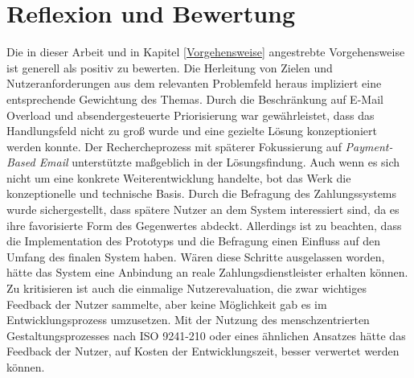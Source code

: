 \section{Reflexion und Bewertung}
\label{Reflektion_und_Bewertung}
Die in dieser Arbeit und in Kapitel \ref{Vorgehensweise} angestrebte Vorgehensweise ist generell als positiv zu bewerten. Die Herleitung von Zielen und Nutzeranforderungen aus dem relevanten Problemfeld heraus impliziert eine entsprechende Gewichtung des Themas. Durch die Beschränkung auf E-Mail Overload und absendergesteuerte Priorisierung war gewährleistet, dass das Handlungsfeld nicht zu groß wurde und eine gezielte Lösung konzeptioniert werden konnte. Der Rechercheprozess mit späterer Fokussierung auf \textit{Payment-Based Email} unterstützte maßgeblich in der Lösungsfindung. Auch wenn es sich nicht um eine konkrete Weiterentwicklung handelte, bot das Werk die konzeptionelle und technische Basis. Durch die Befragung des Zahlungssystems wurde sichergestellt, dass spätere Nutzer an dem System interessiert sind, da es ihre favorisierte Form des Gegenwertes abdeckt. Allerdings ist zu beachten, dass die Implementation des Prototyps und die Befragung einen Einfluss auf den Umfang des finalen System haben. Wären diese Schritte ausgelassen worden, hätte das System eine Anbindung an reale Zahlungsdienstleister erhalten können. Zu kritisieren ist auch die einmalige Nutzerevaluation, die zwar wichtiges Feedback der Nutzer sammelte, aber keine Möglichkeit gab es im Entwicklungsprozess umzusetzen. Mit der Nutzung des menschzentrierten Gestaltungsprozesses nach ISO 9241-210 oder eines ähnlichen Ansatzes hätte das Feedback der Nutzer, auf Kosten der Entwicklungszeit, besser verwertet werden können.


